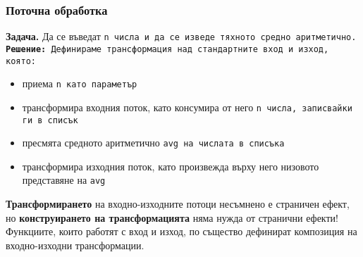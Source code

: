 \documentclass[alsotrans]{beamerswitch}
\begin{document}
\begin{frame}
  \frametitle{Поточна обработка}
  \textbf{Задача.} Да се въведат \tt{n} числа и да се изведе тяхното средно аритметично.\\
  \pause
  \textbf{Решение:} Дефинираме трансформация над стандартните вход и изход, която:
  \begin{itemize}[<+->]
  \item приема \tt{n} като параметър
  \item трансформира входния поток, като \alert{консумира} от него \tt{n} числа, записвайки ги в списък
  \item пресмята средното аритметично \tt{avg} на числата в списъка
  \item трансформира изходния поток, като \alert{произвежда} върху него низовото представяне на \tt{avg}
  \end{itemize}
  \onslide<+->
  \textbf{Трансформирането} на входно-изходните потоци несъмнено е страничен ефект, но \textbf{конструирането на трансформацията} няма нужда от странични ефекти!\\
  \onslide<+->
  \alert{Функциите, които работят с вход и изход, по същество дефинират композиция на входно-изходни трансформации.}
\end{frame}
\end{document}

